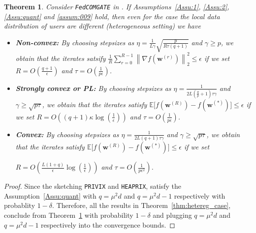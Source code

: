 \documentclass{article}
\newtheorem{theorem}{Theorem}
\begin{document}
\begin{theorem}\label{thm:fromhaddad-het}
 Consider \texttt{FedCOMGATE} in \cite{haddadpour2020federated}. If Assumptions~\ref{Assu:1}, \ref{Assu:2}, \ref{Assu:quant}  and \ref{assum:009} hold, then even for the case the local data distribution of users are different  (heterogeneous setting) we have
 \begin{itemize}
     \item \textbf{Non-convex:} By choosing stepsizes as $\eta=\frac{1}{L\gamma}\sqrt{\frac{p}{R\tau\left(q+1\right)}}$ and $\gamma\geq p$, we obtain that the iterates satsify  $\frac{1}{R}\sum_{r=0}^{R-1}\left\|\nabla f({\boldsymbol{w}}^{(r)})\right\|_2^2\leq \epsilon$ if we set
     $R=O\left(\frac{q+1}{\epsilon}\right)$ and $ \tau=O\left(\frac{1}{p\epsilon}\right)$.
     \item \textbf{Strongly convex or PL:}
      By choosing stepsizes as $\eta=\frac{1}{2L\left(\frac{q}{p}+1\right)\tau\gamma}$ and ${\gamma\geq \sqrt{p\tau}}$, we obtain that the iterates satisfy $\mathbb{E}\Big[f({\boldsymbol{w}}^{(R)})-f({\boldsymbol{w}}^{(*)})\Big]\leq \epsilon$ if we set
      $R=O\left(\left(q+1\right)\kappa\log\left(\frac{1}{\epsilon}\right)\right)$ and $ \tau=O\left(\frac{1}{p\epsilon}\right)$.
     \item \textbf{Convex:}  By choosing stepsizes as $\eta=\frac{1}{2L\left(q+1\right)\tau\gamma}$ and ${\gamma\geq \sqrt{p\tau}}$, we obtain that the iterates satisfy $\mathbb{E}\Big[f({\boldsymbol{w}}^{(R)})-f({\boldsymbol{w}}^{(*)})\Big]\leq \epsilon$ if we set
     
     $R=O\left(\frac{L\left(1+q\right)}{\epsilon}\log\left(\frac{1}{\epsilon}\right)\right)$ and $ \tau=O\left(\frac{1}{p\epsilon^2}\right)$.
 \end{itemize}
 
\end{theorem}
\begin{proof}
Since the sketching \texttt{PRIVIX} and \texttt{HEAPRIX}, satisfy the Assumption~\ref{Assu:quant} with $q=\mu^2d$ and $q=\mu^2d-1$ respectively with probablity $1-\delta$.  Therefore, all the results in Theorem~\ref{thm:hetereg_case}, conclude from Theorem~\ref{thm:fromhaddad-het} with probability $1-\delta$ and plugging $q=\mu^2d$ and $q=\mu^2d-1$ respectively into the convergence bounds.
\end{proof}
\end{document}
